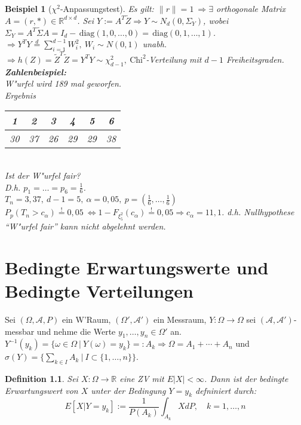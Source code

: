 \documentclass[a4paper,11pt]{book}
\newcommand{\R}{{\mathbb R}}
\newcommand{\diag}{\ensuremath{\,\text{diag}}}
\def\AA{ \mathcal{A} }
\newtheorem*{DefON}{Definition}
\newtheorem{Bsp}{Beispiel}[chapter]
\theoremstyle{nonumberplain}
\renewcommand{\indexname}{Stichwortverzeichnis}
\begin{document}
\begin{Bsp}[$\chi^2$-Anpassungstest]
Es gilt: $\|r\| = 1\ \Rightarrow \exists$ orthogonale Matrix $A = (r, \ast) \in \R^{d \times d}$. Sei $Y := A^T \tilde{Z} \Rightarrow Y \sim N_d(0, \Sigma_Y)$, wobei $\Sigma_Y = A^T \tilde{\Sigma} A = I_d - \diag(1,0,\dots,0) = \diag (0,1,\dots,1)$.\\
$\Rightarrow Y^T Y \stackrel{d}{=} \sum_{i=1}^{d-1} W_i^2,\ W_i \sim N(0,1)$ unabh. $\Rightarrow h(Z) = \tilde{Z}^T \tilde{Z} = Y^T Y \sim \chi_{d-1}^2,\ \text{Chi}^2$-Verteilung mit $d-1$ Freiheitsgraden.\\
\textbf{Zahlenbeispiel:}\\
W"urfel wird 189 mal geworfen.\\
Ergebnis
\begin{tabular}{|c|c|c|c|c|c|}
1 & 2 & 3 & 4 & 5 & 6 \\
\hline
30 & 37 & 26 & 29 & 29 & 38
\end{tabular}\\
Ist der W"urfel fair?\\
D.h. $p_1 = \dots = p_6 = \frac16$.\\
$T_n = 3,37,\ d-1 = 5,\ \alpha = 0,05,\ p = (\frac16,\dots,\frac16)$\\
$P_p(T_n > c_{\alpha}) \stackrel{!}{=} 0,05 \ \Leftrightarrow 1 - F_{\xi_5^2}(c_{\alpha}) \stackrel{!}{=} 0,05 \Rightarrow c_{\alpha} = 11,1$. d.h. Nullhypothese ``W"urfel fair'' kann nicht abgelehnt werden.
\end{Bsp}

\chapter{Bedingte Erwartungswerte und Bedingte Verteilungen}
Sei $(\Omega,\AA,P)$ ein W'Raum, $(\Omega',\AA')$ ein Messraum, $Y: \Omega \rightarrow \Omega$ sei $(\AA,\AA')$-messbar und nehme die Werte $y_1,\dots,y_n \in \Omega'$ an. $Y^{-1}(y_k) = \{ \omega \in \Omega\ |\ Y(\omega) = y_k \} =: A_k \Rightarrow \Omega = A_1 + \cdots + A_n$ und $\sigma(Y) = \{ \sum_{k \in I} A_k\ |\ I \subset \{1,\dots,n\} \}$.

\begin{DefON}
Sei $X: \Omega \rightarrow \R$ eine ZV mit $E|X| < \infty$. Dann ist der bedingte Erwartungswert von $X$ unter der Bedingung $Y = y_k$ defniniert durch:
\[
E[X | Y = y_k ] := \frac1{P(A_k)} \int_{A_k} X dP, \quad k = 1,\dots,n
\]
\end{DefON}

\newpage
\renewcommand{\indexname}{Stichwortverzeichnis}

\printindex
\end{document}
